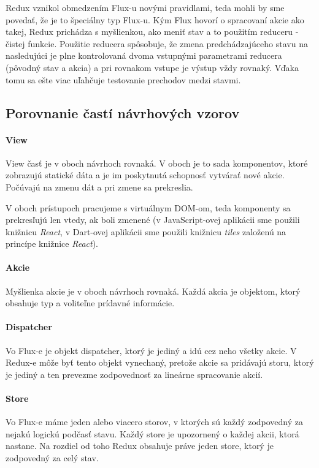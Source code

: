 Redux vznikol obmedzením Flux-u novými pravidlami, teda mohli by sme povedať, že je to špeciálny typ Flux-u. Kým Flux hovorí o spracovaní akcie ako takej, Redux prichádza s myšlienkou, ako meniť stav a to použitím reduceru - čistej funkcie. Použitie reducera spôsobuje, že zmena predchádzajúceho stavu na nasledujúci je plne kontrolovaná dvoma vstupnými parametrami reducera (pôvodný stav a akcia) a pri rovnakom vstupe je výstup vždy rovnaký. Vďaka tomu sa ešte viac uľahčuje testovanie prechodov medzi stavmi.

\subsection{Porovnanie častí návrhových vzorov}

\paragraph{View}
View časť je v oboch návrhoch rovnaká. V oboch je to sada komponentov, ktoré zobrazujú statické dáta a je im poskytnutá schopnosť vytvárať nové akcie. Počúvajú na zmenu dát a pri zmene sa prekreslia.

V oboch prístupoch pracujeme s virtuálnym DOM-om, teda komponenty sa prekresľujú len vtedy, ak boli zmenené (v JavaScript-ovej aplikácii sme použili knižnicu \emph{React}, v Dart-ovej aplikácii sme použili knižnicu \emph{tiles} založenú na princípe knižnice \emph{React}).

\paragraph{Akcie}
Myšlienka akcie je v oboch návrhoch rovnaká. Každá akcia je objektom, ktorý obsahuje typ a voliteľne prídavné informácie.

\paragraph{Dispatcher}
Vo Flux-e je objekt dispatcher, ktorý je jediný a idú cez neho všetky akcie. V Redux-e môže byť tento objekt vynechaný, pretože akcie sa pridávajú storu, ktorý je jediný a ten prevezme zodpovednosť za lineárne spracovanie akcií.

\paragraph{Store}
Vo Flux-e máme jeden alebo viacero storov, v ktorých sú každý zodpovedný za nejakú logickú podčasť stavu. Každý store je upozornený o každej akcii, ktorá nastane. Na rozdiel od toho Redux obsahuje práve jeden store, ktorý je zodpovedný za celý stav.


